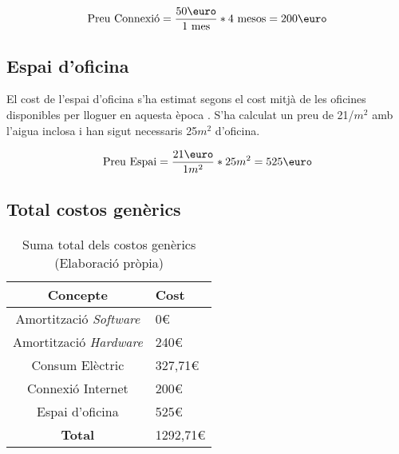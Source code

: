 $$
\text{Preu Connexió} = \frac{50 \text{\euro}}{1 \text{ mes}} * 4 \text{ mesos} = 200\text{\euro}
$$

\subsection{Espai d'oficina}
El cost de l'espai d'oficina s'ha estimat segons el cost mitjà de les oficines disponibles per lloguer en aquesta època \cite{preu-oficina}. S'ha calculat un preu de 21\text{\euro}/$m^2$ amb l'aigua inclosa i han sigut necessaris 25$m^2$ d'oficina.

$$
\text{Preu Espai} = \frac{21 \text{\euro}}{1 m^2} * 25 m^2 = 525\text{\euro}
$$

\subsection{Total costos genèrics}


\begin{table}[H]
    \centering
    \begin{tabular}{c|l}
        \textbf{Concepte}     & \textbf{Cost} \\
        \hline
        Amortització \textit{Software} & 0\euro         \\
        Amortització \textit{Hardware} & 240\euro       \\
        Consum Elèctric                & 327,71\euro    \\
        Connexió Internet              & 200\euro       \\
        Espai d'oficina                & 525\euro       \\
        \hline
        \textbf{Total}                 & 1292,71\euro   \\
    \end{tabular}
    \caption[Costos genèrics]{Suma total dels costos genèrics \\ (Elaboració pròpia)}
    \label{tab:costos_generics}
\end{table}
